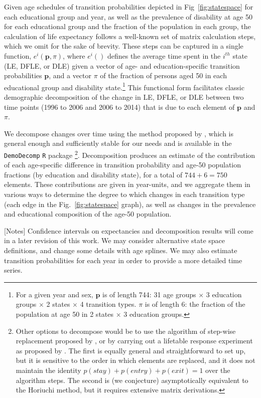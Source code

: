 Given age schedules of transition probabilities depicted in Fig~\ref{fig:statespace} for each educational group and year, as well as the prevalence of disability at age 50 for each educational group and the fraction of the population in each group, the calculation of life expectancy follows a well-known set of matrix calculation steps, which we omit for the sake of brevity. These steps can be captured in a single function, $e^i(\textbf{p},\pi)$, where $e^i()$ defines the average time spent in the $i^{th}$ state (LE, DFLE, or DLE) given a vector of age- and education-specific transition probabilities $\textbf{p}$, and a vector $\pi$ of the fraction of persons aged 50 in each educational group and disability state.\footnote{For a given year and sex, $\textbf{p}$ is of length 744: 31 age groups $\times$ 3 education groups $\times$ 2 states $\times$ 4 transition types. $\pi$ is of length 6: the fraction of the population at age 50 in 2 states $\times$ 3 education groups.} This functional form facilitates classic demographic decomposition of the change in LE, DFLE, or DLE between two time points (1996 to 2006 and 2006 to 2014) that is due to each element of $\textbf{p}$ and $\pi$. 

We decompose changes over time using the method proposed by \citet{horiuchi2008}, which is general enough and sufficiently stable for our needs and is available in the \texttt{DemoDecomp} \texttt{R} package \citep{DemoDecomp}\footnote{Other options to decompose would be to use the algorithm of step-wise replacement proposed by \citet{andreev2002algorithm}, or by carrying out a lifetable response experiment as proposed by \citet{caswell1989analysis}. The first is equally general and straightforward to set up, but it is sensitive to the order in which elements are replaced, and it does not maintain the identity $p(stay) + p(entry) + p(exit) = 1$ over the algorithm steps. The second is (we conjecture) asymptotically equivalent to the Horiuchi method, but it requires extensive matrix derivations.}. Decomposition produces an estimate of the contribution of each age-specific difference in transition probability and age-50 population fractions (by education and disability state), for a total of $744 + 6 = 750$ elements. These contributions are given in year-units, and we aggregate them in various ways to determine the degree to which changes in each transition type (each edge in the Fig.~\ref{fig:statespace} graph), as well as changes in the prevalence and educational composition of the age-50 population.

[Notes] Confidence intervals on expectancies and decomposition results will come in a later revision of this work. We may consider alternative state space definitions, and change some details with age splines. We may also estimate transition probabilities for each year in order to provide a more detailed time series. 

